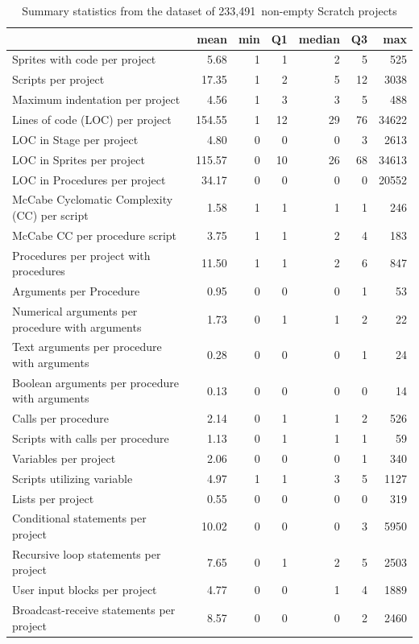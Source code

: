 \documentclass{sig-alternate}
\newcommand{\nScriptPrograms}{233,491}
\begin{document}
\begin{table}[ht]
	\centering
	\begin{tabular}{lrrrrrr}
		\hline
		&\textbf{mean}&\textbf{min}&\textbf{Q1}&\textbf{median}&\textbf{Q3}&\textbf{max}\\
		\hline
		Sprites with code per project&5.68&1&1&2&5&525\\
		Scripts per project&17.35&1&2&5&12&3038\\
		Maximum indentation per project&4.56&1&3&3&5&488\\
		Lines of code (LOC) per project&154.55&1&12&29&76&34622\\
		LOC in Stage per project&4.80&0&0&0&3&2613\\
		LOC in Sprites per project&115.57&0&10&26&68&34613\\
		LOC in Procedures per project&34.17&0&0&0&0&20552\\
		McCabe Cyclomatic Complexity (CC) per script&1.58&1&1&1&1&246\\
		McCabe CC per procedure script&3.75&1&1&2&4&183\\
		Procedures per project with procedures&11.50&1&1&2&6&847\\
		Arguments per Procedure&0.95&0&0&0&1&53\\
		Numerical arguments per procedure with arguments&1.73&0&1&1&2&22\\
		Text arguments per procedure with arguments&0.28&0&0&0&1&24\\
		Boolean arguments per procedure with arguments&0.13&0&0&0&0&14\\
		Calls per procedure&2.14&0&1&1&2&526\\
		Scripts with calls per procedure&1.13&0&1&1&1&59\\
		Variables per project&2.06&0&0&0&1&340\\
		Scripts utilizing variable&4.97&1&1&3&5&1127\\
		Lists per project&0.55&0&0&0&0&319\\
		Conditional statements per project&10.02&0&0&0&3&5950\\
		Recursive loop statements per project&7.65&0&1&2&5&2503\\
		User input blocks per project&4.77&0&0&1&4&1889\\
		Broadcast-receive statements per project&8.57&0&0&0&2&2460\\	
		\hline
	\end{tabular}
	\caption{Summary statistics from the dataset of \nScriptPrograms~non-empty Scratch projects}
	\label{tbl-size}
\end{table}
\end{document}
